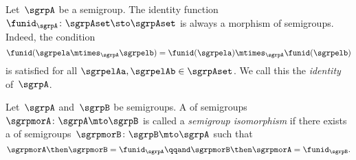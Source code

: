 \begin{ctdefinition}
  \label{def:identity-sgrp-mor}
  Let~$\sgrpA$ be a semigroup.
  The identity function~$\funid_\sgrpA\colon \sgrpAset \sto \sgrpAset$ is always a morphism of semigroups.
  Indeed, the condition
  \begin{equation}
    \funid (\sgrpela \mtimes_{\sgrpA} \sgrpelb) = \funid (\sgrpela) \mtimes_{\sgrpA} \funid(\sgrpelb)
  \end{equation}
  is satisfied for all $\sgrpelAa, \sgrpelAb \in \sgrpAset$. We call this the \emph{identity \whomo} of~$\sgrpA$.
\end{ctdefinition}



\begin{ctdefinition}
  \label{def:semigroup-iso}
  Let~$\sgrpA$ and~$\sgrpB$ be semigroups.
  A \whomo of semigroups~$\sgrpmorA\colon \sgrpA \mto \sgrpB$ is called a \emph{semigroup isomorphism} if there exists a \whomo of semigroups~$\sgrpmorB\colon \sgrpB \mto \sgrpA$ such that
  \begin{equation}
    \label{eq:sgrp-iso-cond}
    \sgrpmorA \then \sgrpmorB = \funid_\sgrpA  \qqand \sgrpmorB \then \sgrpmorA = \funid_\sgrpB.
  \end{equation}
\end{ctdefinition}


